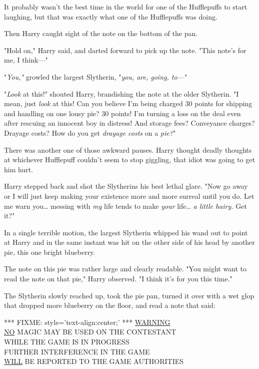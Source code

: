 It probably wasn't the best time in the world for one of the Hufflepuffs to 
start laughing, but that was exactly what one of the Hufflepuffs was doing.

Then Harry caught sight of the note on the bottom of the pan.

"Hold on," Harry said, and darted forward to pick up the note. "This note's for 
me, I think---"

"\emph{You,"} growled the largest Slytherin, "\emph{you, are, going, to---}"

"\emph{Look} at this!" shouted Harry, brandishing the note at the older 
Slytherin. "I mean, just \emph{look} at this! Can you believe I'm being charged 
30 points for shipping and handling on one lousy pie? 30 points! I'm turning a 
loss on the deal even after rescuing an innocent boy in distress! And storage 
fees? Conveyance charges? Drayage costs? How do you get \emph{drayage costs} on 
a \emph{pie?}"

There was another one of those awkward pauses. Harry thought deadly thoughts at 
whichever Hufflepuff couldn't seem to stop giggling, that idiot was going to 
get him hurt.

Harry stepped back and shot the Slytherins his best lethal glare. "Now go away 
or I will just keep making your existence more and more surreal until you do. 
Let me warn you{\ldots} messing with \emph{my} life tends to make \emph{your} 
life{\ldots} \emph{a little hairy.} Get it?"

In a single terrible motion, the largest Slytherin whipped his wand out to 
point at Harry and in the same instant was hit on the other side of his head by 
another pie, this one bright blueberry.

The note on this pie was rather large and clearly readable. "You might want to 
read the note on that pie," Harry observed. "I think it's for you this time."

The Slytherin slowly reached up, took the pie pan, turned it over with a wet 
glop that dropped more blueberry on the floor, and read a note that said:

*** FIXME: style='text-align:center;' ***
\underline{WARNING}\\
\underline{NO} MAGIC MAY BE USED ON THE CONTESTANT\\
WHILE THE GAME IS IN PROGRESS\\
FURTHER INTERFERENCE IN THE GAME\\
\underline{WILL} BE REPORTED TO THE GAME AUTHORITIES

